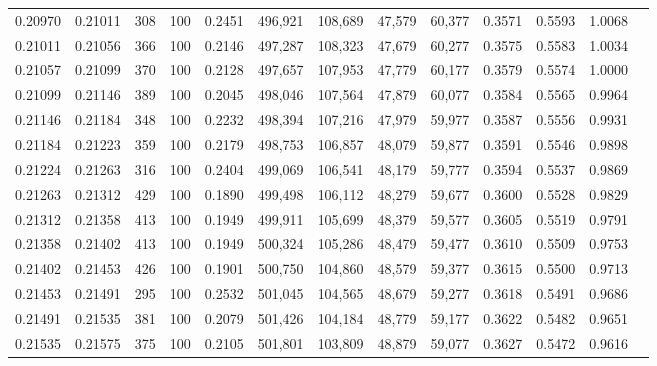 \begin{tabular}{rrrrrrrrrrrrr}
0.20970 & 0.21011 &   308 & 100 &                                     0.2451 & 496,921 & 108,689 &  47,579 &  60,377 & 0.3571 & 0.5593 & 1.0068 \\
0.21011 & 0.21056 &   366 & 100 &                                     0.2146 & 497,287 & 108,323 &  47,679 &  60,277 & 0.3575 & 0.5583 & 1.0034 \\
0.21057 & 0.21099 &   370 & 100 &                                     0.2128 & 497,657 & 107,953 &  47,779 &  60,177 & 0.3579 & 0.5574 & 1.0000 \\
0.21099 & 0.21146 &   389 & 100 &                                     0.2045 & 498,046 & 107,564 &  47,879 &  60,077 & 0.3584 & 0.5565 & 0.9964 \\
0.21146 & 0.21184 &   348 & 100 &                                     0.2232 & 498,394 & 107,216 &  47,979 &  59,977 & 0.3587 & 0.5556 & 0.9931 \\
0.21184 & 0.21223 &   359 & 100 &                                     0.2179 & 498,753 & 106,857 &  48,079 &  59,877 & 0.3591 & 0.5546 & 0.9898 \\
0.21224 & 0.21263 &   316 & 100 &                                     0.2404 & 499,069 & 106,541 &  48,179 &  59,777 & 0.3594 & 0.5537 & 0.9869 \\
0.21263 & 0.21312 &   429 & 100 &                                     0.1890 & 499,498 & 106,112 &  48,279 &  59,677 & 0.3600 & 0.5528 & 0.9829 \\
0.21312 & 0.21358 &   413 & 100 &                                     0.1949 & 499,911 & 105,699 &  48,379 &  59,577 & 0.3605 & 0.5519 & 0.9791 \\
0.21358 & 0.21402 &   413 & 100 &                                     0.1949 & 500,324 & 105,286 &  48,479 &  59,477 & 0.3610 & 0.5509 & 0.9753 \\
0.21402 & 0.21453 &   426 & 100 &                                     0.1901 & 500,750 & 104,860 &  48,579 &  59,377 & 0.3615 & 0.5500 & 0.9713 \\
0.21453 & 0.21491 &   295 & 100 &                                     0.2532 & 501,045 & 104,565 &  48,679 &  59,277 & 0.3618 & 0.5491 & 0.9686 \\
0.21491 & 0.21535 &   381 & 100 &                                     0.2079 & 501,426 & 104,184 &  48,779 &  59,177 & 0.3622 & 0.5482 & 0.9651 \\
0.21535 & 0.21575 &   375 & 100 &                                     0.2105 & 501,801 & 103,809 &  48,879 &  59,077 & 0.3627 & 0.5472 & 0.9616 \\

\end{tabular}
